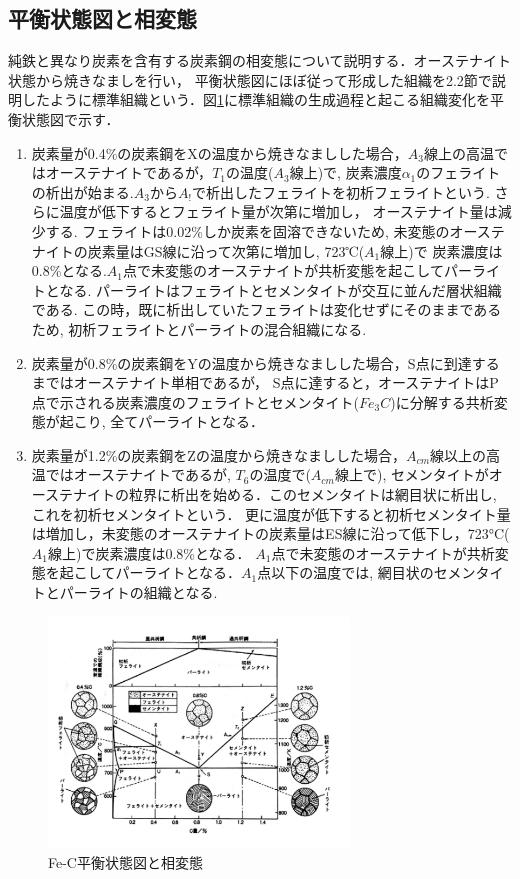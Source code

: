 \documentclass[a4paper,11pt,uplatex]{jsarticle}
\begin{document}
\subsection{平衡状態図と相変態}
純鉄と異なり炭素を含有する炭素鋼の相変態について説明する．オーステナイト状態から焼きなましを行い，
平衡状態図にほぼ従って形成した組織を2.2節で説明したように標準組織という．図\ref{相変態}に標準組織の生成過程と起こる組織変化を平衡状態図で示す．
\begin{enumerate}
  \item 炭素量が0.4\%の炭素鋼をXの温度から焼きなましした場合，$A_3$線上の高温ではオーステナイトであるが，$T_1$の温度($A_3$線上)で,
  炭素濃度$\alpha_1$のフェライトの析出が始まる.$A_3$から$A_!$で析出したフェライトを初析フェライトという. さらに温度が低下するとフェライト量が次第に増加し，
  オーステナイト量は減少する. フェライトは0.02\%しか炭素を固溶できないため, 未変態のオーステナイトの炭素量はGS線に沿って次第に増加し, 723℃($A_1$線上)で
  炭素濃度は0.8\%となる.$A_1$点で未変態のオーステナイトが共析変態を起こしてパーライトとなる. パーライトはフェライトとセメンタイトが交互に並んだ層状組織である.
  この時，既に析出していたフェライトは変化せずにそのままであるため, 初析フェライトとパーライトの混合組織になる.

  \item 炭素量が0.8\%の炭素鋼をYの温度から焼きなましした場合，S点に到達するまではオーステナイト単相であるが，
  S点に達すると，オーステナイトはP点で示される炭素濃度のフェライトとセメンタイト($Fe_3C$)に分解する共析変態が起こり, 全てパーライトとなる．

  \item 炭素量が1.2\%の炭素鋼をZの温度から焼きなましした場合，$A_{cm}$線以上の高温ではオーステナイトであるが, $T_6$の温度で($A_{cm}$線上で),
  セメンタイトがオーステナイトの粒界に析出を始める．このセメンタイトは網目状に析出し, これを初析セメンタイトという．
  更に温度が低下すると初析セメンタイト量は増加し，未変態のオーステナイトの炭素量はES線に沿って低下し，723°C($A_1$線上)で炭素濃度は0.8\%となる．
  $A_1$点で未変態のオーステナイトが共析変態を起こしてパーライトとなる．$A_1$点以下の温度では, 網目状のセメンタイトとパーライトの組織となる.

\end{enumerate}

\begin{figure}
  \begin{center}
    \includegraphics[width = 8cm]{画像/相変態.png}
    \caption{Fe-C平衡状態図と相変態}
    \label{相変態}
  \end{center}
\end{figure}
\end{document}
